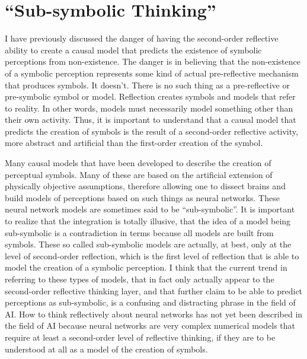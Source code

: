 \section{``Sub-symbolic Thinking''}

I have previously discussed the danger of having the second-order
reflective ability to create a causal model that predicts the
existence of symbolic perceptions from non-existence.  The danger is
in believing that the non-existence of a symbolic perception
represents some kind of actual pre-reflective mechanism that produces
symbols.  It doesn't.  There is no such thing as a pre-reflective or
pre-symbolic symbol or model.  Reflection creates symbols and models
that refer to reality.  In other words, models must necessarily model
something other than their own activity.  Thus, it is important to
understand that a causal model that predicts the creation of symbols
is the result of a second-order reflective activity, more abstract and
artificial than the first-order creation of the symbol.

Many causal models that have been developed to describe the creation
of perceptual symbols.  Many of these are based on the artificial
extension of physically objective assumptions, therefore allowing one
to dissect brains and build models of perceptions based on such things
as neural networks.  These neural network models are sometimes said to
be ``sub-symbolic''.  It is important to realize that the integration
is totally illusive, that the idea of a model being sub-symbolic is a
contradiction in terms because all models are built from symbols.
These so called sub-symbolic models are actually, at best, only at the
level of second-order reflection, which is the first level of
reflection that is able to model the creation of a symbolic
perception.  I think that the current trend in referring to these
types of models, that in fact only actually appear to the second-order
reflective thinking layer, and that further claim to be able to
predict perceptions as sub-symbolic, is a confusing and distracting
phrase in the field of AI.  How to think reflectively about neural
networks has not yet been described in the field of AI because neural
networks are very complex numerical models that require at least a
second-order level of reflective thinking, if they are to be
understood at all as a model of the creation of symbols.

